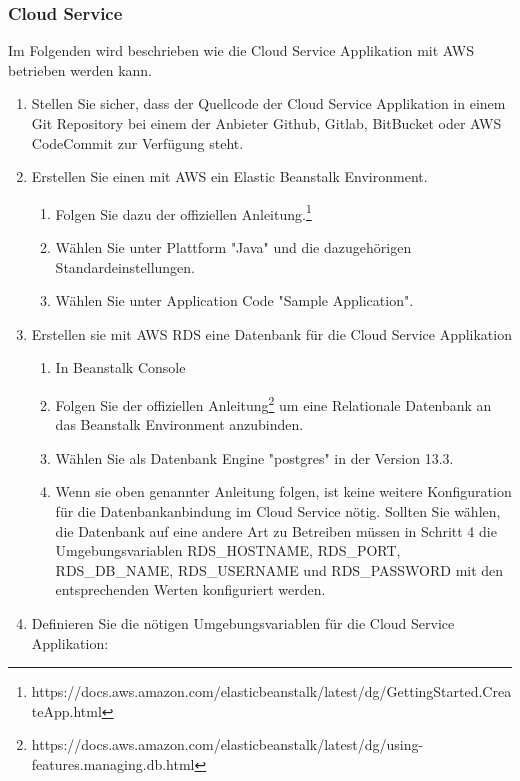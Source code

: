 \subsubsection*{Cloud Service}

Im Folgenden wird beschrieben wie die Cloud Service Applikation mit AWS betrieben werden kann.

\begin{enumerate}
    \item Stellen Sie sicher, dass der Quellcode der Cloud Service Applikation in einem Git Repository bei einem der Anbieter Github, Gitlab, BitBucket oder AWS CodeCommit zur Verfügung steht.
    \item Erstellen Sie einen mit AWS ein Elastic Beanstalk Environment.
    \begin{enumerate}
        \item Folgen Sie dazu der offiziellen Anleitung.\footnote{https://docs.aws.amazon.com/elasticbeanstalk/latest/dg/GettingStarted.CreateApp.html}
        \item Wählen Sie unter Plattform "Java" und die dazugehörigen Standardeinstellungen.
        \item Wählen Sie unter Application Code "Sample Application".
    \end{enumerate}
    \item Erstellen sie mit AWS RDS eine Datenbank für die Cloud Service Applikation
    \begin{enumerate}
        \item In Beanstalk Console
        \item Folgen Sie der offiziellen Anleitung\footnote{https://docs.aws.amazon.com/elasticbeanstalk/latest/dg/using-features.managing.db.html} um eine Relationale Datenbank an das Beanstalk Environment anzubinden.
        \item Wählen Sie als Datenbank Engine "postgres" in der Version 13.3.
        \item Wenn sie oben genannter Anleitung folgen, ist keine weitere Konfiguration für die Datenbankanbindung im Cloud Service nötig.
        Sollten Sie wählen, die Datenbank auf eine andere Art zu Betreiben müssen in Schritt 4 die Umgebungsvariablen RDS\_HOSTNAME, RDS\_PORT, RDS\_DB\_NAME, RDS\_USERNAME und RDS\_PASSWORD mit den entsprechenden Werten konfiguriert werden.
    \end{enumerate}
    \item Definieren Sie die nötigen Umgebungsvariablen für die Cloud Service Applikation:
    \begin{enumerate}

\end{enumerate}
\end{enumerate}
